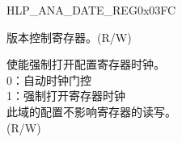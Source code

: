 \begin{register}{H}{LP\_ANA\_DATE\_REG}{0x03FC}\label{regdesc:LPANADATEREG}
%
%
\regnewline%
\begin{regdesc}\begin{reglist}
\label{fielddesc:LPANALPANADATE}\item [LP\_ANA\_LP\_ANA\_DATE] 版本控制寄存器。(R/W)
\label{fielddesc:LPANACLKEN}\item [LP\_ANA\_CLK\_EN] 使能强制打开配置寄存器时钟。\\
0：自动时钟门控\\
1：强制打开寄存器时钟\\
此域的配置不影响寄存器的读写。\\
(R/W)
\end{reglist}\end{regdesc}
\end{register}